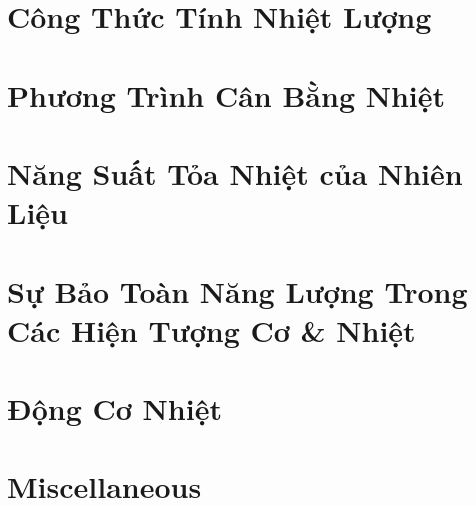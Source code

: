 \documentclass{article}
\numberwithin{equation}{section}
\begin{document}

\section{Công Thức Tính Nhiệt Lượng}


\section{Phương Trình Cân Bằng Nhiệt}


\section{Năng Suất Tỏa Nhiệt của Nhiên Liệu}


\section{Sự Bảo Toàn Năng Lượng Trong Các Hiện Tượng Cơ \& Nhiệt}


\section{Động Cơ Nhiệt}


\section{Miscellaneous}


\printbibliography[heading=bibintoc]
	
\end{document}

